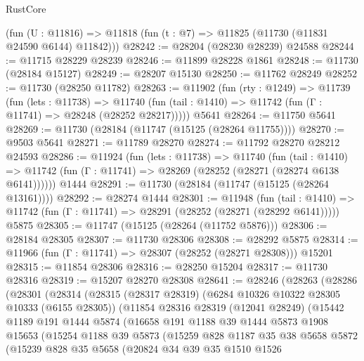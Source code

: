 \begin{lexlean}{RustCore}
\begin{coremodule}
    (fun (U : @11816) => @11818 (fun (t : @7) => @11825 (@11730 (@11831 @24590 @6144) @11842)))
@28242 := @28204 (@28230 @28239) @24588
@28244 := @11715 @28229 @28239
@28246 := @11899 @28228 @1861
@28248 := @11730 (@28184 @15127)
@28249 := @28207 @15130
@28250 := @11762 @28249
@28252 := @11730 (@28250 @11782)
@28263 := @11902
    (fun (rty : @1249) =>
    @11739
      (fun (lets : @11738) =>
      @11740 (fun (tail : @1410) => @11742 (fun (Γ : @11741) => @28248 (@28252 @28217)))))
    @5641
@28264 := @11750 @5641
@28269 := @11730 (@28184 (@11747 (@15125 (@28264 @11755))))
@28270 := @9503 @5641
@28271 := @11789 @28270
@28274 := @11792 @28270 @28212 @24593
@28286 := @11924
    (fun (lets : @11738) =>
    @11740
      (fun (tail : @1410) =>
      @11742 (fun (Γ : @11741) => @28269 (@28252 (@28271 (@28274 @6138 @6141))))))
    @1444
@28291 := @11730 (@28184 (@11747 (@15125 (@28264 @13161))))
@28292 := @28274 @1444
@28301 := @11948
    (fun (tail : @1410) => @11742 (fun (Γ : @11741) => @28291 (@28252 (@28271 (@28292 @6141)))))
    @5875
@28305 := @11747 (@15125 (@28264 (@11752 @5876)))
@28306 := @28184 @28305
@28307 := @11730 @28306
@28308 := @28292 @5875
@28314 := @11966 (fun (Γ : @11741) => @28307 (@28252 (@28271 @28308))) @15201
@28315 := @11854 @28306
@28316 := @28250 @15204
@28317 := @11730 @28316
@28319 := @15207 @28270 @28308
@28641 := @28246
    (@28263
      (@28286
        (@28301
          (@28314
            (@28315
              (@28317 @28319)
              (@6284 @10326 @10322 @28305 @10333 (@6155 @28305))
              (@11854
                @28316
                @28319
                (@12041 @28249)
                (@15442
                  @1189
                  @191
                  @1444
                  @5874
                  (@16658
                    @191
                    @1188
                    @39
                    @1444
                    @5873
                    @1908
                    @15653
                    (@15254
                      @1188
                      @39
                      @5873
                      (@15259
                        @828
                        @1187
                        @35
                        @38
                        @5658
                        @5872
                        (@15239
                          @828
                          @35
                          @5658
                          (@20824
                            @34
                            @39
                            @35
                            @1510
                            @1526

\end{coremodule}
\end{lexlean}
